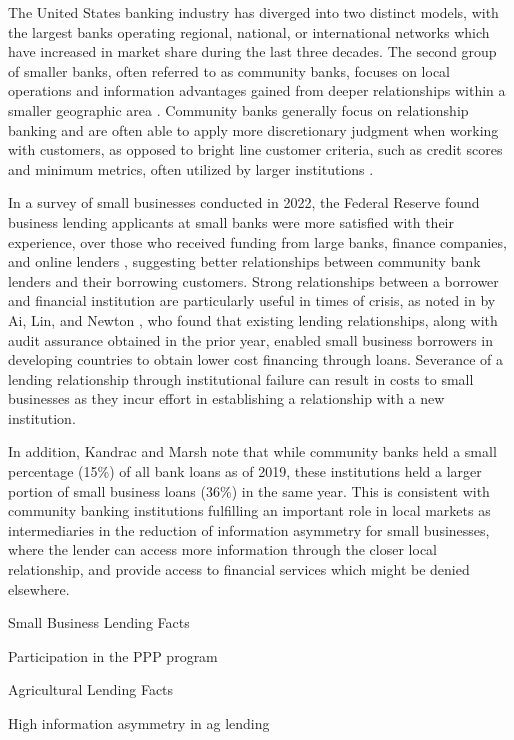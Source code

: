 \documentclass[12pt,letterpaper]{article}
\begin{document}
The United States banking industry has diverged into two distinct models, with the largest banks operating regional, national, or international networks which have increased in market share during the last three decades. The second group of smaller banks, often referred to as community banks, focuses on local operations and information advantages gained from deeper relationships within a smaller geographic area \cite{KandracMarsh2025}. Community banks generally focus on relationship banking and are often able to apply more discretionary judgment when working with customers, as opposed to bright line customer criteria, such as credit scores and minimum metrics, often utilized by larger institutions \cite{ICBA2024}. 

In a survey of small businesses conducted in 2022, the Federal Reserve found business lending applicants at small banks were more satisfied with their experience, over those who received funding from large banks, finance companies, and online lenders \parencite{FRB2023}, suggesting better relationships between community bank lenders and their borrowing customers. Strong relationships between a borrower and financial institution are particularly useful in times of crisis, as noted in by Ai, Lin, and Newton \parencite{AiLinNewton2024}, who found that existing lending relationships, along with audit assurance obtained in the prior year, enabled small business borrowers in developing countries to obtain lower cost financing through loans. Severance of a lending relationship through institutional failure can result in costs to small businesses as they incur effort in establishing a relationship with a new institution.

In addition, Kandrac and Marsh note that while community banks held a small percentage (15\%) of all bank loans as of 2019, these institutions held a larger portion of small business loans (36\%) in the same year. This is consistent with community banking institutions fulfilling an important role in local markets as intermediaries in the reduction of information asymmetry for small businesses, where the lender can access more information through the closer local relationship, and provide access to financial services which might be denied elsewhere.

Small Business Lending Facts

Participation in the PPP program

Agricultural Lending Facts

High information asymmetry in ag lending
\end{document}
